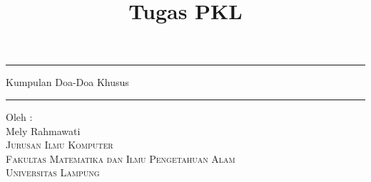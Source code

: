 \documentclass[a4paper,12pt,makeidx]{article}
\title{{\HUGE Tugas PKL}}
\begin{document}
\singlespace
\fullvocalize
\newpage
\begin{center}
 \thispagestyle{empty}
 \newcommand{\HRule}{\rule{\linewidth}{1mm}}
 \setlength{\parindent}{0mm}
 \setlength{\parskip}{0mm}
 \pagebreak
   \HRule
   \begin{center}
      \Huge Kumpulan Doa-Doa Khusus\\[7mm]
    \end{center}
    \HRule


    \begin{center}
      \Large Oleh : \\[5mm]
      \Huge  Mely Rahmawati \\[5mm]
      \Large \textsc{Jurusan Ilmu Komputer} \\[5mm]
      \Large \textsc{Fakultas Matematika dan Ilmu Pengetahuan Alam} \\[5mm]
      \Large \textsc{Universitas Lampung} \\[5mm]
    \end{center}
\end{center}

\onehalfspacing
{}
\tableofcontents

\newpage
\setcounter{page}{1}
\fullvocalize

\end{document}
